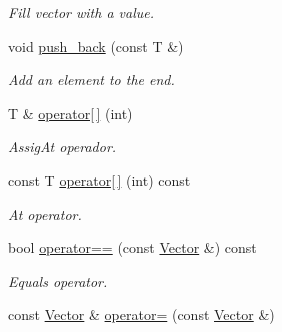 \begin{DoxyCompactItemize}
\begin{DoxyCompactList}\small\item\em Fill vector with a value. \end{DoxyCompactList}\item 
void \hyperlink{classGreati_1_1Vector_a41054b62c64bc913806dbfe6e48352d9}{push\+\_\+back} (const T \&)\hypertarget{classGreati_1_1Vector_a41054b62c64bc913806dbfe6e48352d9}{}\label{classGreati_1_1Vector_a41054b62c64bc913806dbfe6e48352d9}

\begin{DoxyCompactList}\small\item\em Add an element to the end. \end{DoxyCompactList}\item 
T \& \hyperlink{classGreati_1_1Vector_a11bd28b0b2652cb33831c79d2b41a7d7}{operator\mbox{[}$\,$\mbox{]}} (int)\hypertarget{classGreati_1_1Vector_a11bd28b0b2652cb33831c79d2b41a7d7}{}\label{classGreati_1_1Vector_a11bd28b0b2652cb33831c79d2b41a7d7}

\begin{DoxyCompactList}\small\item\em Assig\+At operador. \end{DoxyCompactList}\item 
const T \hyperlink{classGreati_1_1Vector_a96b366520d54a440d27431ba04237c90}{operator\mbox{[}$\,$\mbox{]}} (int) const \hypertarget{classGreati_1_1Vector_a96b366520d54a440d27431ba04237c90}{}\label{classGreati_1_1Vector_a96b366520d54a440d27431ba04237c90}

\begin{DoxyCompactList}\small\item\em At operator. \end{DoxyCompactList}\item 
bool \hyperlink{classGreati_1_1Vector_ae08123134236bcc17848515805877945}{operator==} (const \hyperlink{classGreati_1_1Vector}{Vector} \&) const \hypertarget{classGreati_1_1Vector_ae08123134236bcc17848515805877945}{}\label{classGreati_1_1Vector_ae08123134236bcc17848515805877945}

\begin{DoxyCompactList}\small\item\em Equals operator. \end{DoxyCompactList}\item 
const \hyperlink{classGreati_1_1Vector}{Vector} \& \hyperlink{classGreati_1_1Vector_a001887dfc2edb5a6ddc10f4a4ae24b2b}{operator=} (const \hyperlink{classGreati_1_1Vector}{Vector} \&)\hypertarget{classGreati_1_1Vector_a001887dfc2edb5a6ddc10f4a4ae24b2b}{}\label{classGreati_1_1Vector_a001887dfc2edb5a6ddc10f4a4ae24b2b}


\end{DoxyCompactItemize}
